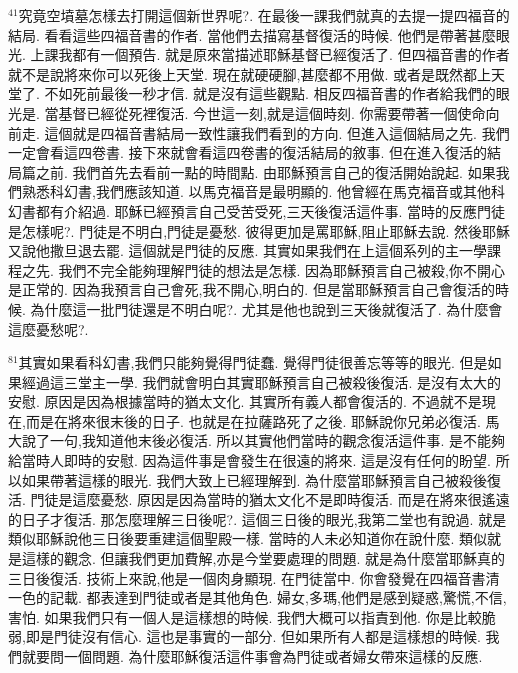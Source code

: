 \documentclass{book}
\begin{document}
$^{41}$究竟空墳墓怎樣去打開這個新世界呢?.
在最後一課我們就真的去提一提四福音的結局.
看看這些四福音書的作者.
當他們去描寫基督復活的時候.
他們是帶著甚麼眼光.
上課我都有一個預告.
就是原來當描述耶穌基督已經復活了.
但四福音書的作者就不是說將來你可以死後上天堂.
現在就硬硬腳,甚麼都不用做.
或者是既然都上天堂了.
不如死前最後一秒才信.
就是沒有這些觀點.
相反四福音書的作者給我們的眼光是.
當基督已經從死裡復活.
今世這一刻,就是這個時刻.
你需要帶著一個使命向前走.
這個就是四福音書結局一致性讓我們看到的方向.
但進入這個結局之先.
我們一定會看這四卷書.
接下來就會看這四卷書的復活結局的敘事.
但在進入復活的結局篇之前.
我們首先去看前一點的時間點.
由耶穌預言自己的復活開始說起.
如果我們熟悉科幻書,我們應該知道.
以馬克福音是最明顯的.
他曾經在馬克福音或其他科幻書都有介紹過.
耶穌已經預言自己受苦受死,三天後復活這件事.
當時的反應門徒是怎樣呢?.
門徒是不明白,門徒是憂愁.
彼得更加是罵耶穌,阻止耶穌去說.
然後耶穌又說他撒旦退去罷.
這個就是門徒的反應.
其實如果我們在上這個系列的主一學課程之先.
我們不完全能夠理解門徒的想法是怎樣.
因為耶穌預言自己被殺,你不開心是正常的.
因為我預言自己會死,我不開心,明白的.
但是當耶穌預言自己會復活的時候.
為什麼這一批門徒還是不明白呢?.
尤其是他也說到三天後就復活了.
為什麼會這麼憂愁呢?.

$^{81}$其實如果看科幻書,我們只能夠覺得門徒蠢.
覺得門徒很善忘等等的眼光.
但是如果經過這三堂主一學.
我們就會明白其實耶穌預言自己被殺後復活.
是沒有太大的安慰.
原因是因為根據當時的猶太文化.
其實所有義人都會復活的.
不過就不是現在,而是在將來很末後的日子.
也就是在拉薩路死了之後.
耶穌說你兄弟必復活.
馬大說了一句,我知道他末後必復活.
所以其實他們當時的觀念復活這件事.
是不能夠給當時人即時的安慰.
因為這件事是會發生在很遠的將來.
這是沒有任何的盼望.
所以如果帶著這樣的眼光.
我們大致上已經理解到.
為什麼當耶穌預言自己被殺後復活.
門徒是這麼憂愁.
原因是因為當時的猶太文化不是即時復活.
而是在將來很遙遠的日子才復活.
那怎麼理解三日後呢?.
這個三日後的眼光,我第二堂也有說過.
就是類似耶穌說他三日後要重建這個聖殿一樣.
當時的人未必知道你在說什麼.
類似就是這樣的觀念.
但讓我們更加費解,亦是今堂要處理的問題.
就是為什麼當耶穌真的三日後復活.
技術上來說,他是一個肉身顯現.
在門徒當中.
你會發覺在四福音書清一色的記載.
都表達到門徒或者是其他角色.
婦女,多瑪,他們是感到疑惑,驚慌,不信,害怕.
如果我們只有一個人是這樣想的時候.
我們大概可以指責到他.
你是比較脆弱,即是門徒沒有信心.
這也是事實的一部分.
但如果所有人都是這樣想的時候.
我們就要問一個問題.
為什麼耶穌復活這件事會為門徒或者婦女帶來這樣的反應.
\end{document}
